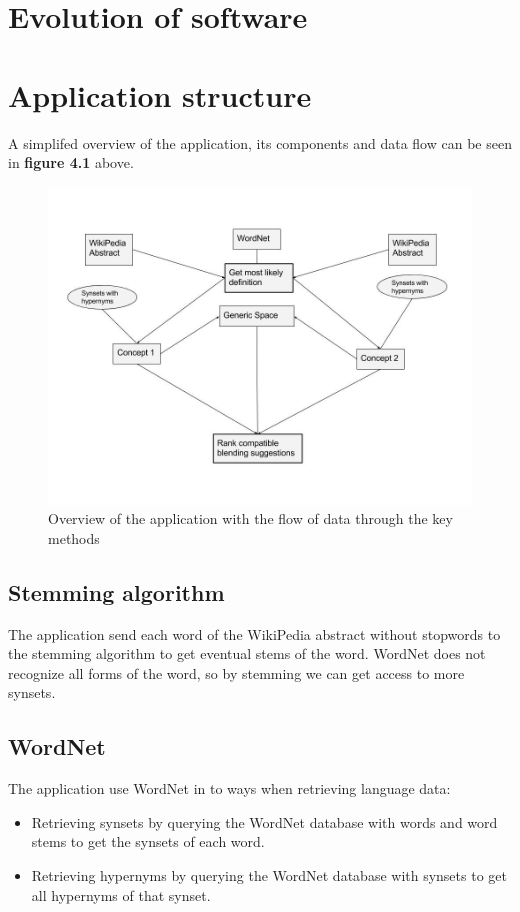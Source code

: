 
\section{Evolution of software}


\section{Application structure}
A simplifed overview of the application, its components and data flow can be seen in \textbf{figure 4.1} above.

\begin{figure}
\centering
\includegraphics[width=1\linewidth]{"Figures/Application structure"}
\caption{Overview of the application with the flow of data through the key methods}
\label{fig:application-structure}
\end{figure}

\subsection{Stemming algorithm}
The application send each word of the WikiPedia abstract without stopwords to the stemming algorithm to get eventual stems of the word. WordNet does not recognize all forms of the word, so by stemming we can get access to more synsets.

\subsection{WordNet}
The application use WordNet in to ways when retrieving language data:
\begin{itemize}
\item Retrieving synsets by querying the WordNet database with words and word stems to get the synsets of each word.
\item Retrieving hypernyms by querying the WordNet database with synsets to get all hypernyms of that synset.
\end{itemize}

